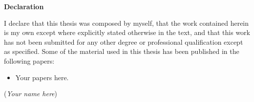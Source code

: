 \vspace*{1.75in}

\begin{center} {\bf Declaration}\end{center}

I declare that this thesis was composed by myself, that the work contained herein is
my own except where explicitly stated otherwise in the text, and that this work has not
been submitted for any other degree or professional qualification except as specified.
Some of the material used in this thesis has been published in the following papers:

\begin{itemize}
    \item Your papers here.
\end{itemize}

\hspace*{\fill}(\textit{Your name here})
